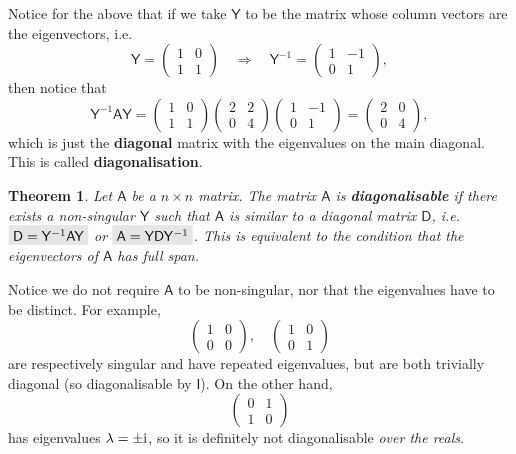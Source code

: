 \documentclass[letter-paper]{tufte-book}
\newtheorem{theorem}{\color{pastel-blue}Theorem}[section]
\newcommand{\zi}{{\rm i}}
\newcommand{\As}{{\mathsf{A}}}
\newcommand{\Ds}{{\mathsf{D}}}
\newcommand{\Is}{{\mathsf{I}}}
\newcommand{\Ys}{{\mathsf{Y}}}
\newcommand{\highlight}[1]{\mathchoice%
  {\colorbox{black!10}{$\displaystyle#1$}}%
  {\colorbox{black!10}{$\textstyle#1$}}%
  {\colorbox{black!10}{$\scriptstyle#1$}}%
  {\colorbox{black!10}{$\scriptscriptstyle#1$}}}%
\begin{document}
Notice for the above that if we take $\Ys$ to be the matrix whose column vectors are the eigenvectors, i.e.
\begin{equation*}
  \Ys = \begin{pmatrix}1 & 0 \\ 1 & 1\end{pmatrix} \quad \Rightarrow \quad \Ys^{-1} = \begin{pmatrix}1 & -1 \\ 0 & 1\end{pmatrix},
\end{equation*}
then notice that 
\begin{equation*}
  \Ys^{-1} \As \Ys = \begin{pmatrix}1 & 0 \\ 1 & 1\end{pmatrix}\begin{pmatrix}2 & 2 \\ 0 & 4\end{pmatrix}\begin{pmatrix}1 & -1 \\ 0 & 1\end{pmatrix} = \begin{pmatrix}2 & 0 \\ 0 & 4\end{pmatrix},
\end{equation*}
which is just the \textbf{diagonal} matrix with the eigenvalues on the main diagonal. This is called \textbf{diagonalisation}.

\begin{theorem}
  Let $\As$ be a $n\times n$ matrix. The matrix $\As$ is \textbf{diagonalisable} if there exists a non-singular $\Ys$ such that $\As$ is similar to a diagonal matrix $\Ds$, i.e. $\highlight{\Ds = \Ys^{-1} \As \Ys}$ or $\highlight{\As = \Ys \Ds\Ys^{-1}}$. This is equivalent to the condition that the eigenvectors of $\As$ has full span.
\end{theorem}

Notice we do not require $\As$ to be non-singular, nor that the eigenvalues have to be distinct. For example,
\begin{equation*}
  \begin{pmatrix}1 & 0 \\ 0 & 0\end{pmatrix}, \quad \begin{pmatrix}1 & 0 \\ 0 & 1\end{pmatrix}
\end{equation*}
are respectively singular and have repeated eigenvalues, but are both trivially diagonal (so diagonalisable by $\Is$). On the other hand,
\begin{equation*}
  \begin{pmatrix}0 & 1 \\ 1 & 0\end{pmatrix}
\end{equation*}
has eigenvalues $\lambda = \pm \zi$, so it is definitely not diagonalisable \emph{over the reals}.
\end{document}
